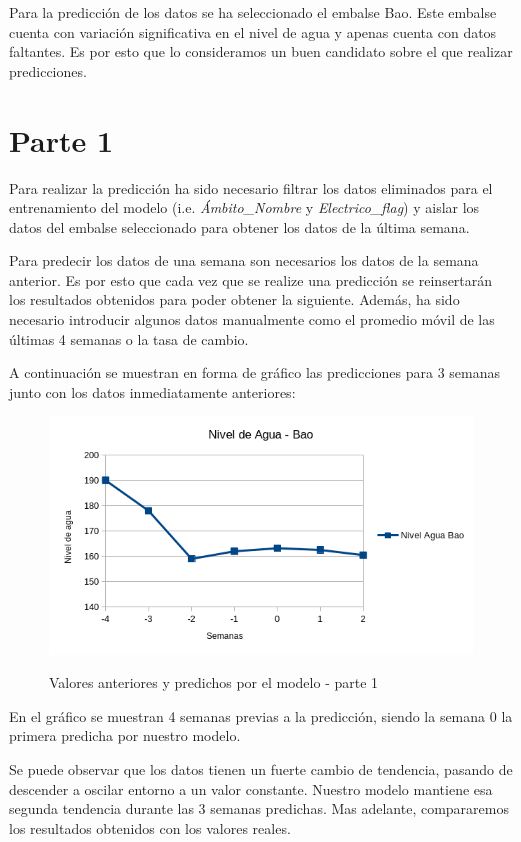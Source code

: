 \documentclass[12pt]{report} %
\begin{document}
Para la predicción de los datos se ha seleccionado el embalse Bao. Este embalse cuenta con variación significativa en el nivel de agua y apenas cuenta con datos faltantes. Es por esto que lo consideramos un buen candidato sobre el que realizar predicciones.

\section{Parte 1}
Para realizar la predicción ha sido necesario filtrar los datos eliminados para el entrenamiento del modelo (i.e. \textit{Ámbito\_Nombre} y \textit{Electrico\_flag}) y aislar los datos del embalse seleccionado para obtener los datos de la última semana.

Para predecir los datos de una semana son necesarios los datos de la semana anterior. Es por esto que cada vez que se realize una predicción se reinsertarán los resultados obtenidos para poder obtener la siguiente. Además, ha sido necesario introducir algunos datos manualmente como el promedio móvil de las últimas 4 semanas o la tasa de cambio.

A continuación se muestran en forma de gráfico las predicciones para 3 semanas junto con los datos inmediatamente anteriores:

\begin{figure}[H]
    \includegraphics[width=\linewidth]{predict-1-bao.png}\\
    \caption{\small Valores anteriores y  predichos por el modelo - parte 1}
\end{figure}
En el gráfico se muestran 4 semanas previas a la predicción, siendo la semana 0 la primera predicha por nuestro modelo.

Se puede observar que los datos tienen un fuerte cambio de tendencia, pasando de descender a oscilar entorno a un valor constante. Nuestro modelo mantiene esa segunda tendencia durante las 3 semanas predichas. Mas adelante, compararemos los resultados obtenidos con los valores reales.
\end{document}
